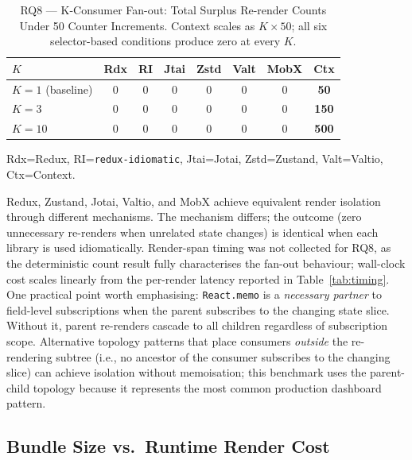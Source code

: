 \documentclass[conference]{IEEEtran}
\newcommand{\code}[1]{\texttt{\small #1}}
\begin{document}
\begin{table}[tb]
\caption{RQ8 --- K-Consumer Fan-out: Total Surplus Re-render Counts
  Under 50 Counter Increments. Context scales as $K{\times}50$;
  all six selector-based conditions produce zero at every $K$.}
\label{tab:kconsumer}
\begin{center}
\scriptsize
\setlength{\tabcolsep}{2pt}
\begin{tabular}{lccccccc}
\toprule
\textbf{$K$} & \textbf{Rdx} & \textbf{RI} & \textbf{Jtai}
  & \textbf{Zstd} & \textbf{Valt} & \textbf{MobX} & \textbf{Ctx} \\
\midrule
$K{=}1$ (baseline)  & 0 & 0 & 0 & 0 & 0 & 0 & \textbf{50}  \\
$K{=}3$             & 0 & 0 & 0 & 0 & 0 & 0 & \textbf{150} \\
$K{=}10$            & 0 & 0 & 0 & 0 & 0 & 0 & \textbf{500} \\
\bottomrule
\end{tabular}
\end{center}
\parbox{\columnwidth}{\scriptsize
  Rdx=Redux, RI=\code{redux-idiomatic}, Jtai=Jotai, Zstd=Zustand,
  Valt=Valtio, Ctx=Context.}
\end{table}

Redux, Zustand, Jotai, Valtio, and MobX achieve equivalent render
isolation through different mechanisms. The mechanism differs; the
outcome (zero unnecessary re-renders when unrelated state changes) is
identical when each library is used idiomatically. Render-span timing was not collected
for RQ8, as the deterministic count result fully characterises the
fan-out behaviour; wall-clock cost scales linearly from the per-render
latency reported in Table~\ref{tab:timing}. One practical point worth emphasising:
\code{React.memo} is a \emph{necessary partner} to field-level subscriptions
when the parent subscribes to the changing state slice.
Without it, parent re-renders cascade to all children regardless of
subscription scope.
Alternative topology patterns that place consumers \emph{outside} the
re-rendering subtree (i.e., no ancestor of the consumer subscribes to
the changing slice) can achieve isolation without memoisation; this
benchmark uses the parent-child topology because it represents the most
common production dashboard pattern.

\subsection{Bundle Size vs.\ Runtime Render Cost}
\end{document}
